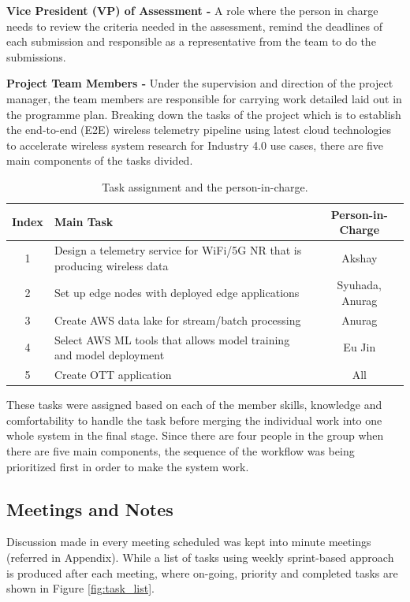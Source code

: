 \textbf{Vice President (VP) of Assessment - }
A role where the person in charge needs to review the criteria needed in the assessment, remind the deadlines of each submission and responsible as a representative from the team to do the submissions.

\textbf{Project Team Members - }
Under the supervision and direction of the project manager, the team members are responsible for carrying work detailed laid out in the programme plan. Breaking down the tasks of the project which is to establish the end-to-end (E2E) wireless telemetry pipeline using latest cloud technologies to accelerate wireless system research for Industry 4.0 use cases, there are five main components of the tasks divided.

\begin{table}[ht]
\centering
\begin{tabular}{ |c|p{9cm}|c| } 
 \hline
 Index & Main Task & Person-in-Charge\\ 
  \hline
1 & Design a telemetry service for WiFi/5G NR that is producing wireless data & Akshay \\ 
  \hline
2 & Set up edge nodes with deployed edge applications & Syuhada, Anurag \\ 
  \hline
3 & Create AWS data lake for stream/batch processing & Anurag \\ 
  \hline
4 & Select AWS ML tools that allows model training and model deployment & Eu Jin \\ 
  \hline
5 & Create OTT application & All \\ 

 \hline
\end{tabular}
\caption{Task assignment and the person-in-charge. }
\label{table:task_management}
\end{table}

These tasks were assigned based on each of the member skills, knowledge and comfortability to handle the task before merging the individual work into one whole system in the final stage. Since there are four people in the group when there are five main components, the sequence of the workflow was being prioritized first in order to make the system work.

\subsection{Meetings and Notes}
Discussion made in every meeting scheduled was kept into minute meetings (referred in Appendix). While a list of tasks using weekly sprint-based approach is produced after each meeting, where on-going, priority and completed tasks are shown in Figure \ref{fig:task_list}. 

